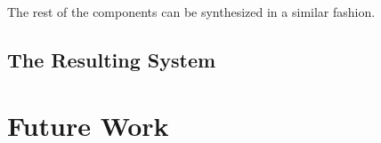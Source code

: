 The rest of the components can be synthesized in a similar fashion. 

\subsection{The Resulting System} \label{subs_casestudyresults}


\section{Future Work} \label{sec_futurework}

